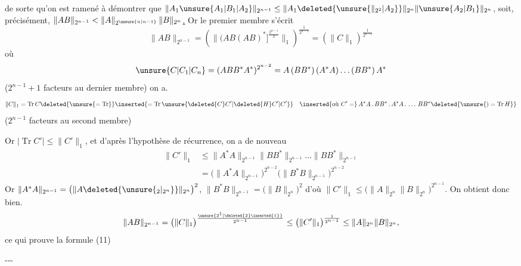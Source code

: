 de sorte qu'on est ramené à démontrer 
  que
$\|A_1\unsure{A_1|B_1|A_2}\|_{2^{n-1}}\leq\|A_1\deleted{\unsure{\|_{2^2}|A_2}}\|_{2^n}\|\unsure{A_2|B_1}\|_{2^n}$, soit, précisément,
\uline{$\|AB\|_{2^{n-1}}<\|A\|_{2^{\unsure{n|n-1}}}\,\|B\|_{2^n}$.}
Or le premier membre s'écrit
\[
\|AB\|_{2^{n-1}}=\left(\bigl\|\bigl(AB(AB)^*\bigr]^{\frac{2^{n-1}}{2}}\bigr\|_1\right)^{\frac1{2^{n-1}}}
=\left(\|C\|_1\right)^{\frac1{2^{n-1}}}
\]
où
\[
\unsure{C|C_1|C_n}=(ABB^*A^*)^{2^{n-2}}=A\,(BB^*)\,(A^*A)\ldots(BB^*)\,A^*
\]
($2^{n-1}+1$ facteurs au dernier membre) on a.
\[
\|C\|_1=\operatorname{Tr} C\deleted{\unsure{=\operatorname{Tr}}}
\inserted{=\operatorname{Tr}\unsure{\deleted{C}C'|\deleted{H}C'|C'}}\quad
\inserted{\text{où }C'=}\,A^*A\,.\,BB^*\,.\,A^*A\,.\,\ldots\,BB^*
\deleted{\unsure{)=\operatorname{Tr}H}}
\]
($2^{n-1}$ facteurs au second membre)

Or $|\operatorname{Tr} C'|\leq\|C'\|_1$, et d'après l'hypothèse de récurrence, on a de nouveau
\[
\begin{aligned}
\|C'\|_1&\leq\|A^*A\|_{2^{n-1}}\|BB^*\|_{2^{n-1}}\ldots\|BB^*\|_{2^{n-1}}\\
&=\bigl(\|A^*A\|_{2^{n-1}}\bigr)^{2^{n-2}}\bigl(\|B^*B\|_{2^{n-1}}\bigr)^{2^{n-2}}
\end{aligned}
\]
Or $\|A^*A\|_{2^{n-1}}=\bigl(\|A\deleted{\unsure{_2|_{2^n}}}\|_{2^n}\bigr)^2$,
$\|B^*B\|_{2^{n-1}}=\bigl(\|B\|_{2^n}\bigr)^2$
d'où $\|C'\|_1\leq\bigl(\|A\|_{2^n}\|B\|_{2^n}\bigr)^{2^{n-1}}$. On obtient donc bien.
\[
\|AB\|_{2^{n-1}}=\bigl(\|C\|_1\bigr)^{\frac{\unsure{2^1|\deleted{2}\inserted{1}}}{2^{n-1}}}
\leq\bigl(\|C'\|_1\bigr)^{\frac1{2^{n-1}}}\leq\|A\|_{2^n}\|B\|_{2^n},
\]
ce qui prouve la formule (11)

\medskip\noindent\hspace*{2em}-\enspace-\enspace-
